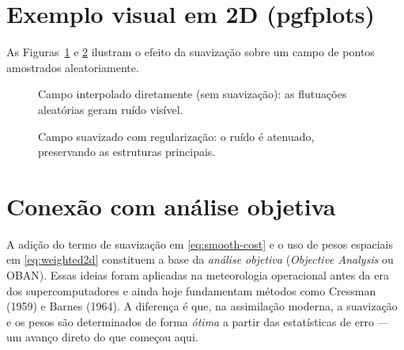 \section{Exemplo visual em 2D (pgfplots)}
As Figuras~\ref{fig:2d-raw} e \ref{fig:2d-smooth} ilustram o efeito da suavização sobre um campo de pontos amostrados aleatoriamente.

\begin{figure}[h!]
\centering
{}
\caption{Campo interpolado diretamente (sem suavização): as flutuações aleatórias geram ruído visível.}
\label{fig:2d-raw}
\end{figure}

\begin{figure}[h!]
\centering
{}
\caption{Campo suavizado com regularização: o ruído é atenuado, preservando as estruturas principais.}
\label{fig:2d-smooth}
\end{figure}

\section{Conexão com análise objetiva}
A adição do termo de suavização em \eqref{eq:smooth-cost} e o uso de pesos espaciais em \eqref{eq:weighted2d} constituem a base da \emph{análise objetiva} (\emph{Objective Analysis} ou OBAN).  
Essas ideias foram aplicadas na meteorologia operacional antes da era dos supercomputadores e ainda hoje fundamentam métodos como Cressman (1959) e Barnes (1964).  
A diferença é que, na assimilação moderna, a suavização e os pesos são determinados de forma \emph{ótima} a partir das estatísticas de erro — um avanço direto do que começou aqui.

